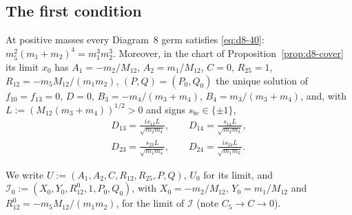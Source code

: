 \subsection{The first condition}

\begin{proposition}\label{prop:d8-first}
At positive masses every Diagram~8 germ satisfies \eqref{eq:d8-40}:
$m_5^2(m_1+m_2)^4=m_1^3m_2^3$.  Moreover, in the chart of Proposition~\ref{prop:d8-cover} its
limit $x_0$ has $A_1=-m_2/M_{12}$, $A_2=m_1/M_{12}$, $C=0$, $R_{25}=1$,
$R_{12}=-m_5M_{12}/(m_1m_2)$, $(P,Q)=(P_0,Q_0)$ the unique solution of $f_{10}=f_{13}=0$,
$D=0$, $B_3=-m_4/(m_3+m_4)$, $B_4=m_3/(m_3+m_4)$, and, with $L:=(M_{12}(m_3+m_4))^{1/2}>0$ and
signs $s_{bc}\in\{\pm1\}$,
\begin{gather*}
  D_{13}=\frac{is_{13}L}{\sqrt{m_2m_4}},\qquad D_{14}=\frac{s_{14}L}{\sqrt{m_2m_3}},\\
  D_{23}=\frac{s_{23}L}{\sqrt{m_1m_4}},\qquad D_{24}=\frac{is_{24}L}{\sqrt{m_1m_3}}.
\end{gather*}
\end{proposition}
We write $U:=(A_1,A_2,C,R_{12},R_{25},P,Q)$, $U_0$ for its limit, and
$\mathcal I_0:=(X_0,Y_0,R_{12}^0,1,P_0,Q_0)$, with $X_0=-m_2/M_{12}$, $Y_0=m_1/M_{12}$ and
$R_{12}^0=-m_5M_{12}/(m_1m_2)$, for the limit of $\mathcal I$ (note $C_5\to C\to0$).

